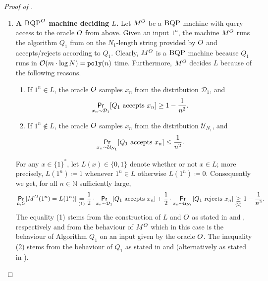 \documentclass{article}
\begin{document}
\begin{proof}[Proof of ]
\begin{enumerate}
    \item \label{Item:BQPmachine} \textbf{A $\textsc{BQP}^{O}$ machine deciding $L$.} Let $M^{O}$ be a $\textsc{BQP}$ machine with query access to the oracle $O$ from  above. Given an input $1^n$, the machine $M^O$ runs the algorithm $Q_1$ from  on the $N_1$-length string provided by $O$ and accepts/rejects according to $Q_1$. Clearly, $M^O$ is a $\textsc{BQP}$ machine because $Q_1$ runs in $\mathcal{O}( m\cdot \log N)=\texttt{poly}(n)$ time. Furthermore, $M^O$ decides $L$ because of the following reasons.
    \begin{enumerate}
        \item \label{item:acceptingProb} If $1^n \in L$, the oracle $O$ samples $x_n$ from the distribution $\mathcal{D}_1$, and
        \begin{equation*}
            \operatorname*{\textsf{Pr}}_{x_n \sim \mathcal{D}_1} [Q_1 \text{ accepts } x_n] \geq 1 - \frac{1}{n^2}.
        \end{equation*}
        \item \label{item:rejectingProb} If $1^n \notin L$, the oracle $O$ samples $x_n$ from the distribution $\mathcal{U}_{N_1}$, and
        \begin{equation*}
            \operatorname*{\textsf{Pr}}_{x_n \sim \mathcal{U}_{N_1}} [Q_1 \text{ accepts } x_n] \leq \frac{1}{n^2}.
        \end{equation*}
    \end{enumerate}
    For any $x \in \{1\}^{*}$, let $L(x) \in \{0,1\}$ denote whether or not $x \in L$; more precisely, $L(1^n) \coloneqq 1$ whenever $1^n \in L$ otherwise $L(1^n) \coloneqq 0$. Consequently we get, for all $n \in \mathbb{N}$ sufficiently large,
    \begin{equation}
    \label{eq:BehaviourOfBQPmachine}
        \operatorname*{\textsf{Pr}}_{L, O}[M^{O}(1^n) = L(1^n)] \underset{(1)}{=}\frac{1}{2} \cdot \operatorname*{\textsf{Pr}}_{x_n \sim \mathcal{D}_1} [Q_1 \text{ accepts } x_n] + \frac{1}{2} \cdot \operatorname*{\textsf{Pr}}_{x_n \sim \mathcal{U}_{N_1}} [Q_1 \text{ rejects } x_n] \underset{(2)}{\geq} 1 - \frac{1}{n^2}.
    \end{equation}    
    The equality (1) stems from the construction of $L$ and $O$ as stated in  and , respectively and from the behaviour of $M^{O}$ which in this case is the behaviour of Algorithm $Q_1$ on an input given by the oracle $O$. The inequality (2) stems from the behaviour of $Q_1$ as stated in  and  (alternatively as stated in ).
    

\end{enumerate}
\end{proof}
\end{document}

